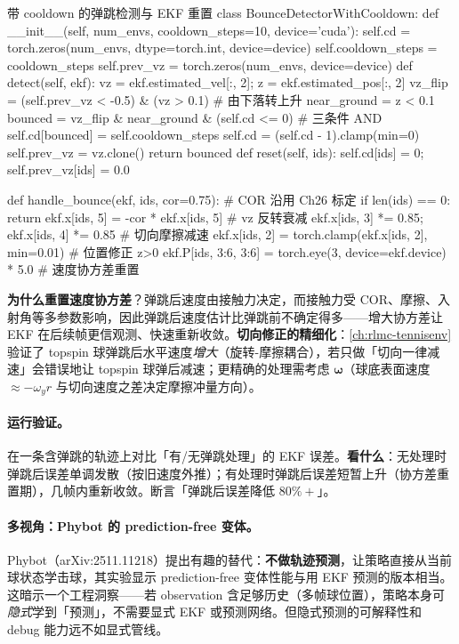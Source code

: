 \begin{codebox}[Python]{带 cooldown 的弹跳检测与 EKF 重置}
class BounceDetectorWithCooldown:
    def __init__(self, num_envs, cooldown_steps=10, device='cuda'):
        self.cd = torch.zeros(num_envs, dtype=torch.int, device=device)
        self.cooldown_steps = cooldown_steps
        self.prev_vz = torch.zeros(num_envs, device=device)
    def detect(self, ekf):
        vz = ekf.estimated_vel[:, 2]; z = ekf.estimated_pos[:, 2]
        vz_flip = (self.prev_vz < -0.5) & (vz > 0.1)             # 由下落转上升
        near_ground = z < 0.1
        bounced = vz_flip & near_ground & (self.cd <= 0)         # 三条件 AND
        self.cd[bounced] = self.cooldown_steps
        self.cd = (self.cd - 1).clamp(min=0)
        self.prev_vz = vz.clone()
        return bounced
    def reset(self, ids):
        self.cd[ids] = 0; self.prev_vz[ids] = 0.0

def handle_bounce(ekf, ids, cor=0.75):                          # COR 沿用 Ch26 标定
    if len(ids) == 0: return
    ekf.x[ids, 5] = -cor * ekf.x[ids, 5]                        # vz 反转衰减
    ekf.x[ids, 3] *= 0.85; ekf.x[ids, 4] *= 0.85               # 切向摩擦减速
    ekf.x[ids, 2] = torch.clamp(ekf.x[ids, 2], min=0.01)       # 位置修正 z>0
    ekf.P[ids, 3:6, 3:6] = torch.eye(3, device=ekf.device) * 5.0   # 速度协方差重置
\end{codebox}

\textbf{为什么重置速度协方差}？弹跳后速度由接触力决定，而接触力受 COR、摩擦、入射角等多参数影响，因此弹跳后速度估计比弹跳前不确定得多——增大协方差让 EKF 在后续帧更信观测、快速重新收敛。\textbf{切向修正的精细化}：\cref{ch:rlmc-tennisenv} 验证了 topspin 球弹跳后水平速度\emph{增大}（旋转-摩擦耦合），若只做「切向一律减速」会错误地让 topspin 球弹后减速；更精确的处理需考虑 $\boldsymbol\omega$（球底表面速度 $\approx-\omega_y r$ 与切向速度之差决定摩擦冲量方向）。

\paragraph{运行验证。}在一条含弹跳的轨迹上对比「有/无弹跳处理」的 EKF 误差。\textbf{看什么}：无处理时弹跳后误差单调发散（按旧速度外推）；有处理时弹跳后误差短暂上升（协方差重置期），几帧内重新收敛。断言「弹跳后误差降低 $80\%+$」。

\paragraph{多视角：Phybot 的 prediction-free 变体。}Phybot（arXiv:2511.11218）提出有趣的替代：\textbf{不做轨迹预测}，让策略直接从当前球状态学击球，其实验显示 prediction-free 变体性能与用 EKF 预测的版本相当\cite{tennis_phybot2025}。这暗示一个工程洞察——若 observation 含足够历史（多帧球位置），策略本身可\emph{隐式}学到「预测」，不需要显式 EKF 或预测网络。但隐式预测的可解释性和 debug 能力远不如显式管线。

